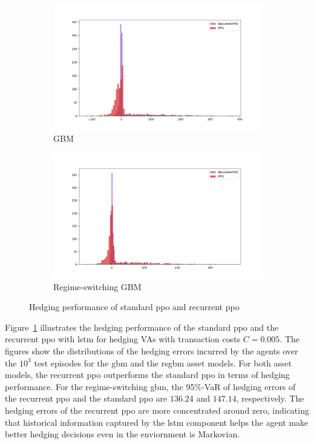 \begin{figure}[ht!]
    \centering
    \begin{subfigure}{0.45\textwidth}
        \includegraphics[width=\textwidth]{./futureWork/figures/PPOs_GBM.png}
        \caption{GBM}
    \end{subfigure}
    \hspace{1cm}
    \begin{subfigure}{0.45\textwidth}
        \includegraphics[width=\textwidth]{./futureWork/figures/PPOs_GBMRS.png}
        \caption{Regime-switching GBM}
    \end{subfigure}
    \caption{Hedging performance of standard \gls{ppo} and recurrent \gls{ppo}} 
    \label{fig3:ppo_result}
\end{figure}

Figure~\ref{fig3:ppo_result} illustrates the hedging performance of the standard \gls{ppo} and the recurrent \gls{ppo} with \gls{lstm} for hedging VAs with transaction costs $C=0.005$.
The figures show the distributions of the hedging errors incurred by the agents over the $10^3$ test episodes for the \gls{gbm} and the \gls{rsgbm} asset models.
For both asset models, the recurrent \gls{ppo} outperforms the standard \gls{ppo} in terms of hedging performance.
For the regime-switching \gls{gbm}, the 95\%-VaR of hedging errors of the recurrent \gls{ppo} and the standard \gls{ppo} are $136.24$ and $147.14$, respectively.
The hedging errors of the recurrent \gls{ppo} are more concentrated around zero, indicating that historical information captured by the \gls{lstm} component helps the agent make better hedging decisions even in the enviornment is Markovian.

